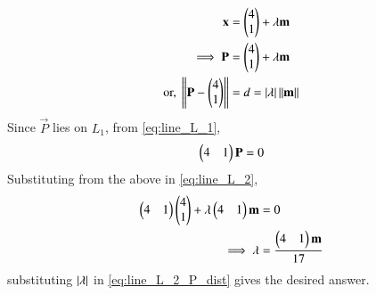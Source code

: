 \begin{enumerate}[label=\arabic*.,ref=\thesubsection.\theenumi]
\begin{align}
\vec{x} &= \myvec{4\\1} + \lambda \vec{m} 
\\
\label{eq:line_L_2_P}
\implies \vec{P} &= \myvec{4\\1} + \lambda \vec{m} 
\\
\label{eq:line_L_2_P_dist}
\text{or, } \norm{\vec{P} - \myvec{4\\1}} &= d = \abs{\lambda}\norm{\vec{m} }
%
\end{align}
%
Since $\vec{P}$ lies on $L_1$, from \eqref{eq:line_L_1},
%
\begin{align}
\begin{pmatrix}4 & 1\end{pmatrix}\mathbf{P}  = 0
\end{align}
%
Substituting from the above in \eqref{eq:line_L_2},
%
\begin{align}
\begin{pmatrix}4 & 1\end{pmatrix}\begin{pmatrix}4\\1\end{pmatrix} + \lambda \begin{pmatrix}4 & 1\end{pmatrix}\mathbf{m}  &= 0
\\
\implies \lambda &= \frac{\begin{pmatrix}4 & 1\end{pmatrix}\mathbf{m}}{17}
\end{align}
%
substituting $\left\vert\lambda\right\vert$ in \eqref{eq:line_L_2_P_dist} gives the desired answer.


\end{enumerate}
